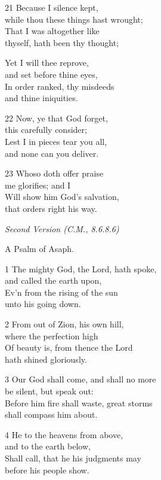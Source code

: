 21 Because I silence kept,\\
while thou these things hast wrought;\\
That I was altogether like\\
thyself, hath been thy thought;

Yet I will thee reprove,\\
and set before thine eyes,\\
In order ranked, thy misdeeds\\
and thine iniquities.

22 Now, ye that God forget,\\
this carefully consider;\\
Lest I in pieces tear you all,\\
and none can you deliver.

23 Whoso doth offer praise\\
me glorifies; and I\\
Will show him God’s salvation,\\
that orders right his way.

\begin{center}
\quad{}\quad{}
\end{center}

\emph{Second Version (C.M., 8.6.8.6)}

A Psalm of Asaph.

1 The mighty God, the Lord, hath spoke,\\
and called the earth upon,\\
Ev’n from the rising of the sun\\
unto his going down.

2 From out of Zion, his own hill,\\
where the perfection high\\
Of beauty is, from thence the Lord\\
hath shined gloriously.

3 Our God shall come, and shall no more\\
be silent, but speak out:\\
Before him fire shall waste, great storms\\
shall compass him about.

4 He to the heavens from above,\\
and to the earth below,\\
Shall call, that he his judgments may\\
before his people show.

